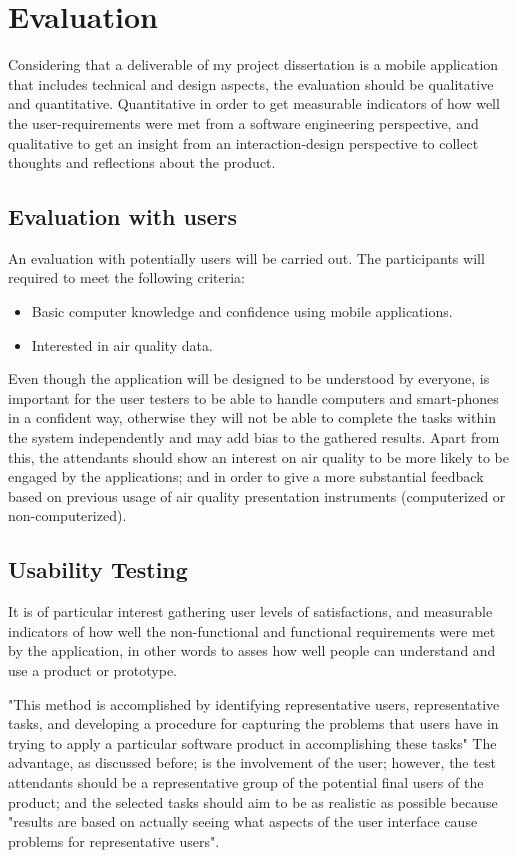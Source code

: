 \section{Evaluation}
Considering that a deliverable of my project dissertation is a mobile application that includes technical and design aspects, the evaluation should be qualitative and quantitative. Quantitative in order to get measurable indicators of how well the user-requirements were met from a software engineering perspective, and qualitative to get an insight from an interaction-design perspective to collect thoughts and reflections about the product.

\subsection{Evaluation with users}
An evaluation with potentially users will be carried out. The participants will required to meet the following criteria:
\begin{itemize}
	\item Basic computer knowledge and confidence using mobile applications.
	\item Interested in air quality data.
\end{itemize}

Even though the application will be designed to be understood by everyone, is important for the user testers to be able to handle computers and smart-phones in a confident way, otherwise they will not be able to complete the tasks within the system independently and may add bias to the gathered results. Apart from this, the attendants should show an interest on air quality to be more likely to be engaged by the applications; and in order to give a more substantial feedback based on previous usage of air quality presentation instruments (computerized or non-computerized).

\subsection{Usability Testing}
It is of particular interest gathering user levels of satisfactions, and measurable indicators of how well the non-functional and functional requirements were met by the application, in other words to asses how well people can understand and use a product or prototype.

"This method is accomplished by identifying representative users, representative tasks, and developing a procedure for capturing the problems that users have in trying to apply a particular software product in accomplishing these tasks" \cite{Scholtz2003} The advantage, as discussed before; is the involvement of the user; however, the test attendants should be a representative group of the potential final users of the product; and the selected tasks should aim to be as realistic as possible because "results are based on actually seeing what aspects of the user interface cause problems for representative users". \cite{Scholtz2003}

